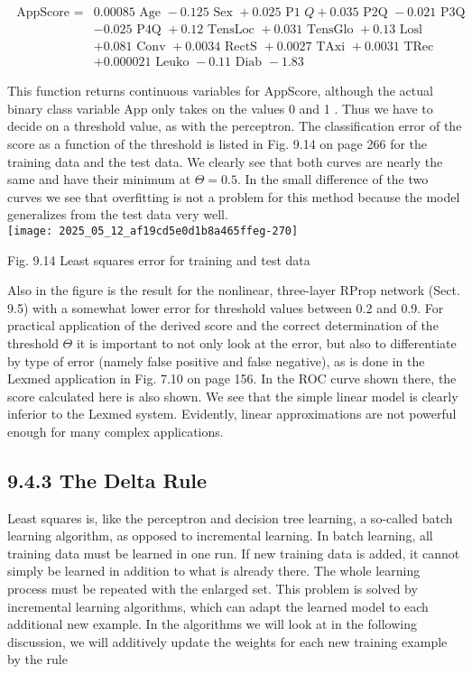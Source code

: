 \documentclass[10pt]{article}
\begin{document}
$$
\begin{aligned}
\text { AppScore }= & 0.00085 \text { Age }-0.125 \text { Sex }+0.025 \text { P1 } Q+0.035 \text { P2Q }-0.021 \text { P3Q } \\
& -0.025 \text { P4Q }+0.12 \text { TensLoc }+0.031 \text { TensGlo }+0.13 \text { Losl } \\
& +0.081 \text { Conv }+0.0034 \text { RectS }+0.0027 \text { TAxi }+0.0031 \text { TRec } \\
& +0.000021 \text { Leuko }-0.11 \text { Diab }-1.83
\end{aligned}
$$

This function returns continuous variables for AppScore, although the actual binary class variable App only takes on the values 0 and 1 . Thus we have to decide on a threshold value, as with the perceptron. The classification error of the score as a function of the threshold is listed in Fig. 9.14 on page 266 for the training data and the test data. We clearly see that both curves are nearly the same and have their minimum at $\Theta=0.5$. In the small difference of the two curves we see that overfitting is not a problem for this method because the model generalizes from the test data very well.\\
\texttt{[image: 2025\_05\_12\_af19cd5e0d1b8a465ffeg-270]}

Fig. 9.14 Least squares error for training and test data

Also in the figure is the result for the nonlinear, three-layer RProp network (Sect. 9.5) with a somewhat lower error for threshold values between 0.2 and 0.9. For practical application of the derived score and the correct determination of the threshold $\Theta$ it is important to not only look at the error, but also to differentiate by type of error (namely false positive and false negative), as is done in the Lexmed application in Fig. 7.10 on page 156. In the ROC curve shown there, the score calculated here is also shown. We see that the simple linear model is clearly inferior to the Lexmed system. Evidently, linear approximations are not powerful enough for many complex applications.

\subsection*{9.4.3 The Delta Rule}
Least squares is, like the perceptron and decision tree learning, a so-called batch learning algorithm, as opposed to incremental learning. In batch learning, all training data must be learned in one run. If new training data is added, it cannot simply be learned in addition to what is already there. The whole learning process must be repeated with the enlarged set. This problem is solved by incremental learning algorithms, which can adapt the learned model to each additional new example. In the algorithms we will look at in the following discussion, we will additively update the weights for each new training example by the rule
\end{document}
